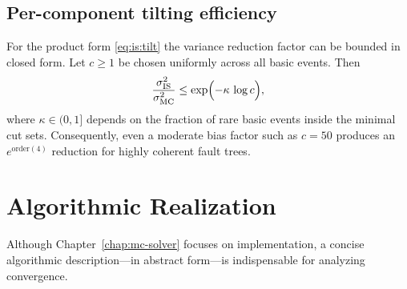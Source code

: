 \subsection{Per-component tilting efficiency}
For the product form \eqref{eq:is:tilt} the variance reduction factor can be
bounded in closed form.  Let \(c\ge1\) be chosen uniformly across all basic
events.  Then
\begin{equation}
  \frac{\sigma^{2}_{\text{IS}}}{\sigma^{2}_{\text{MC}}}
    \le \exp\Bigl(-\kappa\,\log c\Bigr),
\end{equation}
where \(\kappa\in(0,1]\) depends on the fraction of rare basic events inside
the minimal cut sets.  Consequently, even a moderate bias factor such as
\(c=50\) produces an \(e^{\text{order}(4)}\) reduction for highly coherent
fault trees.

\section{Algorithmic Realization}
\label{sec:is:algorithm}

Although Chapter~\ref{chap:mc-solver} focuses on implementation, a concise
algorithmic description—in abstract form—is indispensable for analyzing
convergence.

